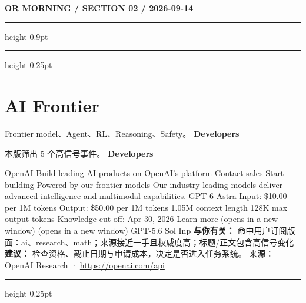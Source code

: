 \documentclass[10.5pt]{ctexart}
\begin{document}
\newpage
{\small\bfseries OR MORNING / SECTION 02 / 2026-09-14}
\vspace{2mm}
\hrule height 0.9pt
\vspace{1.5mm}
\hrule height 0.25pt
\vspace{4mm}
\section*{AI Frontier}
{\color{ormuted} Frontier model、Agent、RL、Reasoning、Safety。}
\vspace{2mm}
{\LARGE\bfseries Developers}\par
\vspace{1mm}
{\color{ormuted} 本版筛出 5 个高信号事件。}
\vspace{3mm}
{\Large\bfseries Developers}\par
OpenAI Build leading AI products on OpenAI’s platform Contact sales Start building Powered by our frontier models Our industry-leading models deliver advanced intelligence and multimodal capabilities. GPT-6 Astra Input: \$10.00 per 1M tokens Output: \$50.00 per 1M tokens 1.05M context length 128K max output tokens Knowledge cut-off: Apr 30, 2026 Learn more (opens in a new window) (opens in a new window) GPT-5.6 Sol Inp
\textbf{与你有关：} 命中用户订阅版面：ai、research、math；来源接近一手且权威度高；标题/正文包含高信号变化
\textbf{建议：} 检查资格、截止日期与申请成本，决定是否进入任务系统。
{\footnotesize\color{ormuted} 来源：OpenAI Research · \url{https://openai.com/api}}
\vspace{4mm}
\hrule height 0.25pt
\vspace{3mm}
\end{document}

